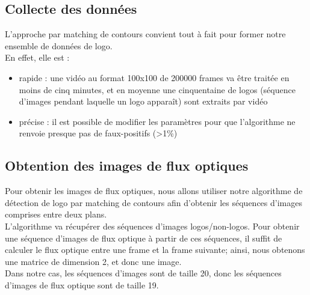 \documentclass[11pt]{article}
\begin{document}
\subsection{Collecte des données}
\label{sec:org371e7be}
L'approche par matching de contours convient tout à fait pour former notre ensemble de données de logo.\\

En effet, elle est :\\
\begin{itemize}
\item rapide : une vidéo au format 100x100 de 200000 frames va être traitée en moins de cinq minutes, et en moyenne une cinquentaine de logos (séquence d'images pendant laquelle un logo apparaît) sont extraits par vidéo\\
\item précise : il est possible de modifier les paramètres pour que l'algorithme ne renvoie presque pas de faux-positifs (>1\%)\\
\end{itemize}

\subsection{Obtention des images de flux optiques}
\label{sec:orgb0858ea}
Pour obtenir les images de flux optiques, nous allons utiliser notre algorithme de détection de logo par matching de contours afin d'obtenir les séquences d'images comprises entre deux plans.\\
L'algorithme va récupérer des séquences d'images logos/non-logos. Pour obtenir une séquence d'images de flux optique à partir de ces séquences, il suffit de calculer le flux optique entre une frame et la frame suivante; ainsi, nous obtenons une matrice de dimension 2, et donc une image.\\
Dans notre cas, les séquences d'images sont de taille 20, donc les séquences d'images de flux optique sont de taille 19.\\
\end{document}
